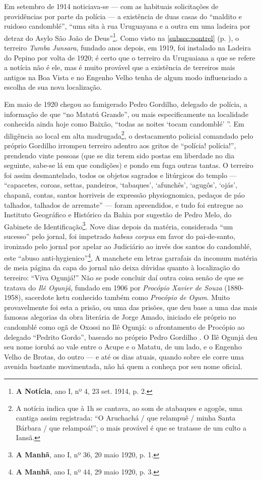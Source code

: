 Em setembro de 1914 noticiava-se --- com as habituais solicitações de providências por parte da polícia --- a existência de duas casas do ``maldito e ruidoso candomblé'', ``uma sita à rua Uruguayana e a outra em uma ladeira por detraz do Asylo São João de Deus''\footnote{\textbf{A Notícia}, ano I, nº 4, 23 set. 1914, p. 2.}. Como visto na \autoref{subsec:pontrel} (p. \pageref{subsec:pontrel}), o terreiro \textit{Tumba Junsara}, fundado anos depois, em 1919, foi instalado na Ladeira do Pepino por volta de 1920; é certo que o terreiro da Uruguaiana a que se refere a notícia não é ele, mas é muito provável que a existência de terreiros mais antigos na Boa Vista e no Engenho Velho tenha de algum modo influenciado a escolha de sua nova localização.

Em maio de 1920 chegou ao famigerado Pedro Gordilho, delegado de polícia, a informação de que ``no Matatú Grande'', ou mais especificamente na localidade conhecida ainda hoje como Baixão, ``todas as noites `tocam candomblé' ''. Em diligência ao local em alta madrugada\footnote{A notícia indica que à 1h se cantava, ao som de atabaques e agogôs, uma cantiga assim registrada: ``O Aruchachá / que relampuê / minha Santa Bárbara / que relampoá!''; o mais provável é que se tratasse de um culto a Iansã.}, o destacamento policial comandado pelo próprio Gordilho irrompeu terreiro adentro aos gritos de ``polícia! polícia!'', prendendo vinte pessoas (que se diz terem sido postas em liberdade no dia seguinte, sabe-se lá em que condições) e pondo em fuga outras tantas. O terreiro foi assim desmantelado, todos os objetos sagrados e litúrgicos do templo --- ``capacetes, coroas, settas, pandeiros, `tabaques', `afunchês', `agugôs', `ojás', chapanã, contas, santos horriveis de expressão physiognomica, pedaços de páo talhados, talhados de arremate'' --- foram apreendidos, e tudo foi entregue ao Instituto Geográfico e Histórico da Bahia por sugestão de Pedro Melo, do Gabinete de Identificação\footnote{\textbf{A Manhã}, ano I, nº 36, 20 maio 1920, p. 1.}. Nove dias depois da matéria, considerada ``um sucesso'' pelo jornal, foi impetrado \textit{habeas corpus} em favor do pai-de-santo, ironizado pelo jornal por apelar ao Judiciário ao invés dos santos do candomblé, este ``abuso anti-hygienico''\footnote{\textbf{A Manhã}, ano I, nº 44, 29 maio 1920, p. 3.}, A manchete em letras garrafais da incomum matéria de meia página da capa do jornal não deixa dúvidas quanto à localização do terreiro: ``Viva Ogunjá!'' Não se pode concluir daí outra coisa senão de que se tratava do \textit{Ilê Ogunjá}, fundado em 1906 por \textit{Procópio Xavier de Souza} (1880-1958), sacerdote ketu conhecido também como \textit{Procópio de Ogum}. Muito provavelmente foi esta a prisão, ou uma das prisões, que deu base a uma das mais famosas alegorias da obra literária de Jorge Amado, iniciado ele próprio no candomblé como ogã de Oxossi no Ilê Ogunjá: o afrontamento de Procópio ao delegado ``Pedrito Gordo'', baseado no próprio Pedro Gordilho \cite[p.~236-242]{amado_tenda_2010}. O Ilê Ogunjá deu seu nome iorubá ao vale entre o Acupe e o Matatu, de um lado, e o Engenho Velho de Brotas, do outro --- e até os dias atuais, quando sobre ele corre uma avenida bastante movimentada, não há quem a conheça por seu nome oficial.

